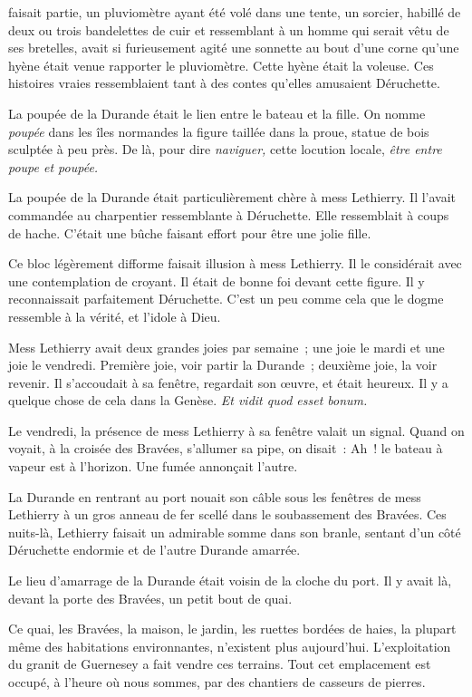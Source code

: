 \documentclass[french,twoside]{book} %
\begin{document}
faisait partie, un pluviomètre ayant été volé dans une tente, un sorcier, habillé de deux ou trois bandelettes de cuir et ressemblant à un homme qui serait vêtu de ses bretelles, avait si furieusement agité une sonnette au bout d’une corne qu’une hyène était venue rapporter le pluviomètre. Cette hyène était la voleuse. Ces histoires vraies ressemblaient tant à des contes qu’elles amusaient Déruchette.\par
La poupée de la Durande était le lien entre le bateau et la fille. On nomme \emph{poupée} dans les îles normandes la figure taillée dans la proue, statue de bois sculptée à peu près. De là, pour dire \emph{naviguer,} cette locution locale, \emph{être entre poupe et poupée.}\par
La poupée de la Durande était particulièrement chère à mess Lethierry. Il l’avait commandée au charpentier ressemblante à Déruchette. Elle ressemblait à coups de hache. C’était une bûche faisant effort pour être une jolie fille.\par
Ce bloc légèrement difforme faisait illusion à mess Lethierry. Il le considérait avec une contemplation de croyant. Il était de bonne foi devant cette figure. Il y reconnaissait parfaitement Déruchette. C’est un peu  comme cela que le dogme ressemble à la vérité, et l’idole à Dieu.\par
Mess Lethierry avait deux grandes joies par semaine ; une joie le mardi et une joie le vendredi. Première joie, voir partir la Durande ; deuxième joie, la voir revenir. Il s’accoudait à sa fenêtre, regardait son œuvre, et était heureux. Il y a quelque chose de cela dans la Genèse. \emph{Et vidit quod esset bonum.}\par
Le vendredi, la présence de mess Lethierry à sa fenêtre valait un signal. Quand on voyait, à la croisée des Bravées, s’allumer sa pipe, on disait : Ah ! le bateau à vapeur est à l’horizon. Une fumée annonçait l’autre.\par
La Durande en rentrant au port nouait son câble sous les fenêtres de mess Lethierry à un gros anneau de fer scellé dans le soubassement des Bravées. Ces nuits-là, Lethierry faisait un admirable somme dans son branle, sentant d’un côté Déruchette endormie et de l’autre Durande amarrée.\par
Le lieu d’amarrage de la Durande était voisin de la cloche du port. Il y avait là, devant la porte des Bravées, un petit bout de quai.\par
Ce quai, les Bravées, la maison, le jardin, les ruettes bordées de haies, la plupart même des habitations environnantes, n’existent plus aujourd’hui. L’exploitation du granit de Guernesey a fait vendre ces terrains. Tout cet emplacement est occupé, à l’heure où nous sommes, par des chantiers de casseurs de pierres.
\end{document}
